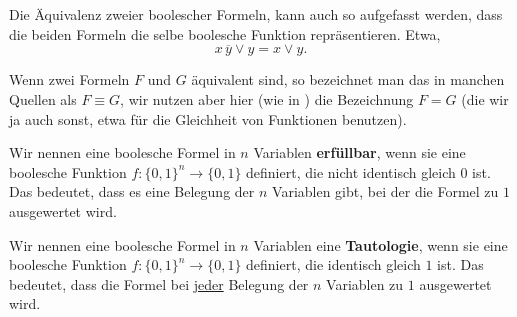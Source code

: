\begin{bem}
	Die Äquivalenz zweier boolescher Formeln, kann auch so aufgefasst werden, dass die beiden Formeln die selbe boolesche Funktion repräsentieren. Etwa, 
	\[
		x \, \overline{y}\vee y= x \vee y.  
	\]
\end{bem} 

\begin{bem}
	Wenn zwei Formeln $F$ und $G$ äquivalent sind, so bezeichnet man das in manchen Quellen als $F \equiv G$, wir nutzen aber hier (wie in \cite{Lov20}) die Bezeichnung $F = G$ (die wir ja auch sonst, etwa für die  Gleichheit von Funktionen benutzen). 
\end{bem} 

\begin{defn} 
Wir nennen eine boolesche Formel in $n$ Variablen \textbf{erfüllbar}, wenn sie eine boolesche Funktion $f : \{0,1\}^n \to \{0,1\}$ definiert, die nicht identisch gleich $0$ ist. Das bedeutet, dass es eine Belegung der $n$ Variablen gibt, bei der die Formel zu $1$ ausgewertet wird. 
\end{defn} 

\begin{defn} 
Wir nennen eine boolesche Formel in $n$ Variablen eine \textbf{Tautologie}, wenn sie eine boolesche Funktion $f: \{0,1\}^n \to \{0,1\}$ definiert, die identisch gleich $1$ ist. Das bedeutet, dass die Formel bei \underline{jeder} Belegung der $n$ Variablen zu $1$ ausgewertet wird. 
\end{defn} 


